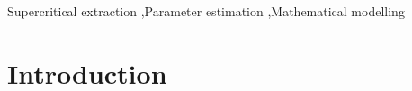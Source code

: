 \documentclass[a4paper,fleqn]{cas-dc}
\begin{document}
\begin{keywords}
Supercritical extraction \sep Parameter estimation \sep Mathematical modelling
\end{keywords}

\maketitle


\section{Introduction}
\end{document}
